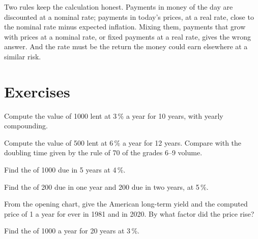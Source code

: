Two rules keep the calculation honest. Payments in money of the day are discounted at a nominal rate; payments in today's prices, at a real rate, close to the nominal rate
minus expected inflation. Mixing them,  payments that grow with prices at a nominal rate, or fixed payments at a real rate, gives the wrong answer. And the rate
must be the return the money could earn elsewhere at a similar risk.

\section{Exercises}

\begin{exercise}[$\star$]\label{exo:g12:present-value:1}
Compute the value of 1000 lent at 3\,\% a year for 10 years, with yearly compounding.
\end{exercise}

\begin{exercise}[$\star$]\label{exo:g12:present-value:2}
Compute the value of 500 lent at 6\,\% a year for 12 years. Compare with the doubling time given by the rule of 70 of the grades 6--9 volume.
\end{exercise}

\begin{exercise}[$\star$]\label{exo:g12:present-value:3}
Find the  of 1000 due in 5 years at 4\,\%.
\end{exercise}

\begin{exercise}[$\star$]\label{exo:g12:present-value:4}
Find the  of 200 due in one year and 200 due in two years, at 5\,\%.
\end{exercise}

\begin{exercise}[$\star$]\label{exo:g12:present-value:5}
From the opening chart, give the American long-term yield and the computed price of 1 a year for ever in 1981 and in 2020. By what factor did the price rise?
\end{exercise}

\begin{exercise}[$\star\star$]\label{exo:g12:present-value:6}
Find the  of 1000 a year for 20 years at 3\,\%.
\end{exercise}

